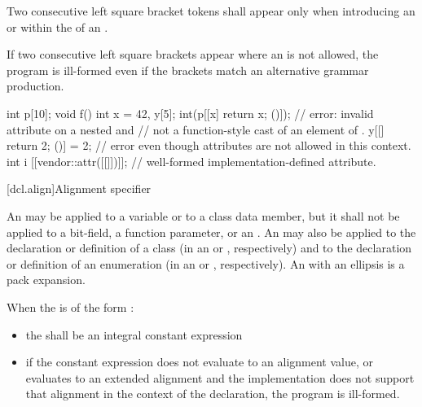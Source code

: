 \pnum
Two consecutive left square bracket tokens shall appear only
when introducing an  or
within the  of
an .
\begin{note} If two consecutive left square brackets appear
where an  is not allowed, the program is ill-formed even
if the brackets match an alternative grammar production. \end{note} \begin{example}
\begin{codeblock}
int p[10];
void f() {
  int x = 42, y[5];
  int(p[[x] { return x; }()]);  // error: invalid attribute on a nested  and
                                // not a function-style cast of an element of .
  y[[] { return 2; }()] = 2;    // error even though attributes are not allowed in this context.
  int i [[vendor::attr([[]])]]; // well-formed implementation-defined attribute.
}
\end{codeblock}
\end{example}

[dcl.align]{Alignment specifier}%

\pnum
An 
may be applied to a variable
or to a class data member, but it shall not be applied to a bit-field, a function
parameter, or an .
An  may also be applied to the declaration or
definition of a class (in an
 or
, respectively) and to the
declaration or definition of an enumeration (in an
 or ,
respectively).
An  with an ellipsis is a pack expansion.

\pnum
When the  is of the form
  \tcode{)}:

\begin{itemize}
\item the  shall be an integral constant expression

\item if the constant expression does not evaluate to an alignment
value, or evaluates to an extended alignment and
the implementation does not support that alignment in the context of the
declaration, the program is ill-formed.
\end{itemize}

